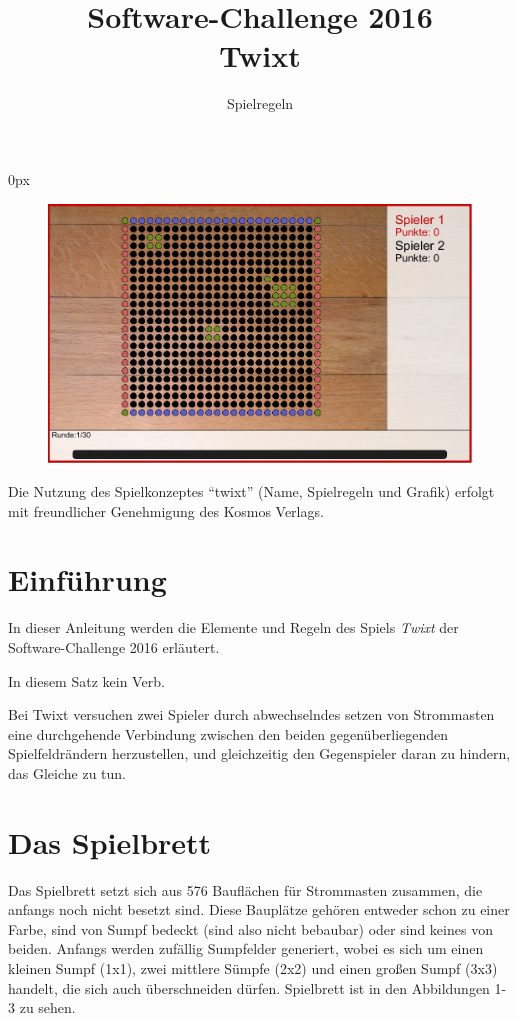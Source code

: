 \documentclass[a4paper, ngerman]{scrartcl}
\title{Software-Challenge 2016 \\ Twixt}
\subtitle{Spielregeln}
\begin{document}
\parindent0px
\maketitle

\begin{figure}[h!]
        \centering
        \includegraphics[width=\linewidth]{bilder/gui.png}
\end{figure}
\vspace*{\fill}

Die Nutzung des Spielkonzeptes "`twixt"' (Name, Spielregeln und Grafik)
erfolgt mit freundlicher Genehmigung des Kosmos Verlags.

\newpage

\tableofcontents

\newpage

\section{Einführung}

In dieser Anleitung werden die Elemente und Regeln des Spiels \emph{Twixt} der
Software-Challenge 2016 erläutert.

In diesem Satz kein Verb.

Bei Twixt versuchen zwei Spieler durch abwechselndes setzen von Strommasten eine
durchgehende Verbindung zwischen den beiden gegenüberliegenden Spielfeldrändern
herzustellen, und gleichzeitig den Gegenspieler daran zu hindern, das Gleiche zu
tun. 

\section{Das Spielbrett}
Das Spielbrett setzt sich aus 576 Bauflächen für Strommasten zusammen, die
anfangs noch nicht besetzt sind.
Diese Bauplätze gehören entweder schon zu einer Farbe, sind von Sumpf bedeckt
(sind also nicht bebaubar) oder sind keines von beiden.
Anfangs werden zufällig Sumpfelder generiert, wobei es sich um einen kleinen
Sumpf (1x1), zwei mittlere Sümpfe (2x2) und einen großen Sumpf (3x3) handelt,
die sich auch überschneiden dürfen. Spielbrett ist in den Abbildungen 1-3 zu
sehen.
\end{document}

